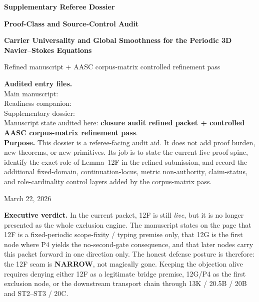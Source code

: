 \documentclass[11pt,letterpaper]{article}
\newcommand{\narrow}{\textcolor{Warn}{\textbf{NARROW}}}
\begin{document}
\begin{titlepage}
\centering
\vspace*{1.1cm}
{\Large\color{Accent}\bfseries Supplementary Referee Dossier\par}
\vspace{0.35cm}
{\LARGE\bfseries Proof-Class and Source-Control Audit\par}
\vspace{0.25cm}
{\Large\bfseries Carrier Universality and Global Smoothness for the Periodic 3D Navier--Stokes Equations\par}
\vspace{0.25cm}
{\large Refined manuscript + AASC corpus-matrix controlled refinement pass\par}
\vspace{0.8cm}

\begin{tcolorbox}[width=0.93\textwidth,colback=Light,colframe=Accent,boxrule=1pt]
\small
\textbf{Audited entry files.}\\[-0.1em]
\footnotesize Main manuscript: \\
Readiness companion: \\
Supplementary dossier: \\[0.35em]
\small Manuscript state audited here: \textbf{closure audit refined packet + controlled AASC corpus-matrix refinement pass}.\\[0.35em]
\textbf{Purpose.} This dossier is a referee-facing audit aid. It does not add proof burden, new theorems, or new primitives. Its job is to state the current live proof spine, identify the exact role of Lemma~12F in the refined submission, and record the additional fixed-domain, continuation-locus, metric non-authority, claim-status, and role-cardinality control layers added by the corpus-matrix pass.
\end{tcolorbox}

\vfill
{\large March 22, 2026\par}
\end{titlepage}
\clearpage
{}

\begin{verdictbox}
\textbf{Executive verdict.} In the current packet, 12F is still \emph{live}, but it is no longer presented as the whole exclusion engine. The manuscript states on the page that 12F is a fixed-periodic scope-fixity / typing premise only, that 12G is the first node where P4 yields the no-second-gate consequence, and that later nodes carry this packet forward in one direction only. The honest defense posture is therefore: the 12F seam is \narrow{}, not magically gone. Keeping the objection alive requires denying either 12F as a legitimate bridge premise, 12G/P4 as the first exclusion node, or the downstream transport chain through 13K / 20.5B / 20B and ST2--ST3 / 20C.
\end{verdictbox}
\end{document}
